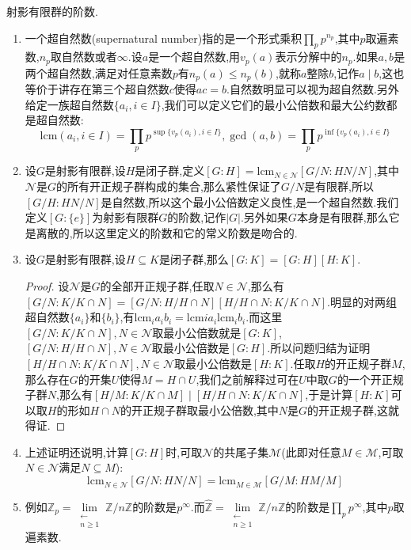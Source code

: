 射影有限群的阶数.
\begin{enumerate}
	\item 一个超自然数(supernatural number)指的是一个形式乘积$\prod_pp^{n_p}$,其中$p$取遍素数,$n_p$取自然数或者$\infty$.设$a$是一个超自然数,用$v_p(a)$表示分解中的$n_p$.如果$a,b$是两个超自然数,满足对任意素数$p$有$n_p(a)\le n_p(b)$,就称$a$整除$b$,记作$a\mid b$,这也等价于讲存在第三个超自然数$c$使得$ac=b$.自然数明显可以视为超自然数.另外给定一族超自然数$\{a_i,i\in I\}$,我们可以定义它们的最小公倍数和最大公约数都是超自然数:
	$$\mathrm{lcm}(a_i,i\in I)=\prod_pp^{\sup\{v_p(a_i),i\in I\}},\gcd(a,b)=\prod_pp^{\inf\{v_p(a_i),i\in I\}}$$
	\item 设$G$是射影有限群,设$H$是闭子群,定义$[G:H]=\mathrm{lcm}_{N\in\mathscr{N}}[G/N:HN/N]$,其中$\mathscr{N}$是$G$的所有开正规子群构成的集合,那么紧性保证了$G/N$是有限群,所以$[G/H:HN/N]$是自然数,所以这个最小公倍数定义良性,是一个超自然数.我们定义$[G:\{e\}]$为射影有限群$G$的阶数,记作$|G|$.另外如果$G$本身是有限群,那么它是离散的,所以这里定义的阶数和它的常义阶数是吻合的.
	\item 设$G$是射影有限群,设$H\subseteq K$是闭子群,那么$[G:K]=[G:H][H:K]$.
	\begin{proof}
		
		设$\mathscr{N}$是$G$的全部开正规子群,任取$N\in\mathscr{N}$,那么有$[G/N:K/K\cap N]=[G/N:H/H\cap N][H/H\cap N:K/K\cap N]$.明显的对两组超自然数$\{a_i\}$和$\{b_i\}$,有$\mathrm{lcm}_ia_ib_i=\mathrm{lcm}ia_i\mathrm{lcm}_ib_i$.而这里$[G/N:K/K\cap N],N\in\mathscr{N}$取最小公倍数就是$[G:K]$,$[G/N:H/H\cap N],N\in\mathscr{N}$取最小公倍数是$[G:H]$.所以问题归结为证明$[H/H\cap N:K/K\cap N],N\in\mathscr{N}$取最小公倍数是$[H:K]$.任取$H$的开正规子群$M$,那么存在$G$的开集$U$使得$M=H\cap U$,我们之前解释过可在$U$中取$G$的一个开正规子群$N$,那么有$[H/M:K/K\cap M]\mid[H/H\cap N:K/K\cap N]$,于是计算$[H:K]$可以取$H$的形如$H\cap N$的开正规子群取最小公倍数,其中$N$是$G$的开正规子群,这就得证.
	\end{proof}
    \item 上述证明还说明,计算$[G:H]$时,可取$\mathscr{N}$的共尾子集$\mathscr{M}$(此即对任意$M\in\mathscr{M}$,可取$N\in\mathscr{N}$满足$N\subseteq M$):
    $$\mathrm{lcm}_{N\in\mathscr{N}}[G/N:HN/N]=\mathrm{lcm}_{M\in\mathscr{M}}[G/M:HM/M]$$
    \item 例如$\mathbb{Z}_p=\lim\limits_{\substack{\leftarrow\\n\ge1}}\mathbb{Z}/n\mathbb{Z}$的阶数是$p^{\infty}$.而$\widehat{\mathbb{Z}}=\lim\limits_{\substack{\leftarrow\\n\ge1}}\mathbb{Z}/n\mathbb{Z}$的阶数是$\prod_pp^{\infty}$,其中$p$取遍素数.
\end{enumerate}

